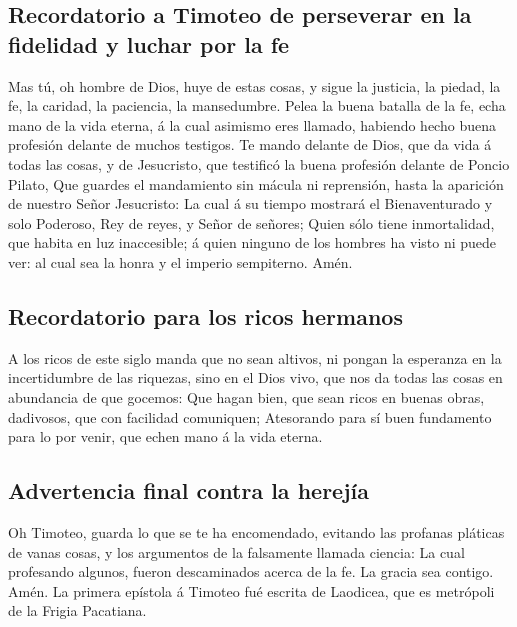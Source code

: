 \hypertarget{recordatorio-a-timoteo-de-perseverar-en-la-fidelidad-y-luchar-por-la-fe}{%
\subsection{Recordatorio a Timoteo de perseverar en la fidelidad y
luchar por la
fe}\label{recordatorio-a-timoteo-de-perseverar-en-la-fidelidad-y-luchar-por-la-fe}}

 Mas tú, oh hombre de Dios, huye de estas cosas, y sigue la
justicia, la piedad, la fe, la caridad, la paciencia, la mansedumbre.
 Pelea la buena batalla de la fe, echa mano de la vida
eterna, á la cual asimismo eres llamado, habiendo hecho buena profesión
delante de muchos testigos.  Te mando delante de Dios, que
da vida á todas las cosas, y de Jesucristo, que testificó la buena
profesión delante de Poncio Pilato,  Que guardes el
mandamiento sin mácula ni reprensión, hasta la aparición de nuestro
Señor Jesucristo:  La cual á su tiempo mostrará el
Bienaventurado y solo Poderoso, Rey de reyes, y Señor de señores;
 Quien sólo tiene inmortalidad, que habita en luz
inaccesible; á quien ninguno de los hombres ha visto ni puede ver: al
cual sea la honra y el imperio sempiterno. Amén.

\hypertarget{recordatorio-para-los-ricos-hermanos}{%
\subsection{Recordatorio para los ricos
hermanos}\label{recordatorio-para-los-ricos-hermanos}}

 A los ricos de este siglo manda que no sean altivos, ni
pongan la esperanza en la incertidumbre de las riquezas, sino en el Dios
vivo, que nos da todas las cosas en abundancia de que gocemos:
 Que hagan bien, que sean ricos en buenas obras, dadivosos,
que con facilidad comuniquen;  Atesorando para sí buen
fundamento para lo por venir, que echen mano á la vida eterna.

\hypertarget{advertencia-final-contra-la-herejuxeda}{%
\subsection{Advertencia final contra la
herejía}\label{advertencia-final-contra-la-herejuxeda}}

 Oh Timoteo, guarda lo que se te ha encomendado, evitando
las profanas pláticas de vanas cosas, y los argumentos de la falsamente
llamada ciencia:  La cual profesando algunos, fueron
descaminados acerca de la fe. La gracia sea contigo. Amén. La primera
epístola á Timoteo fué escrita de Laodicea, que es metrópoli de la
Frigia Pacatiana.
